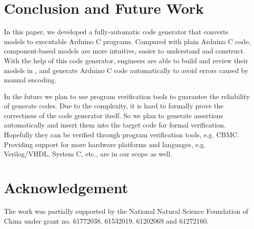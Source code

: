 \section{Conclusion and Future Work}
\label{sec:conclusion}

In this paper, we developed a fully-automatic code generator that converts \lang{} models to executable Arduino C programs. Compared with plain Arduino C code, component-based \lang{} models are more intuitive, easier to understand and construct. With the help of this code generator, engineers are able to build and review their models in \lang{}, and generate Arduino C code automatically to avoid errors caused by manual encoding.

In the future we plan to use program verification tools to guarantee the reliability of generate codes.  Due to the complexity, it is hard to formally prove the correctness of the code generator itself. So we plan to generate assertions automatically and insert them into the target code for formal verification. Hopefully they can be verified through program verification tools, e.g. CBMC\cite{Clarke2004}.
Providing support for more hardware platforms and languages, e.g. Verilog/VHDL, System C, etc., are in our scope as well.

\section*{Acknowledgement}
The work was partially supported by the National Natural Science Foundation of China under grant no. 61772038, 61532019, 61202069 and 61272160.